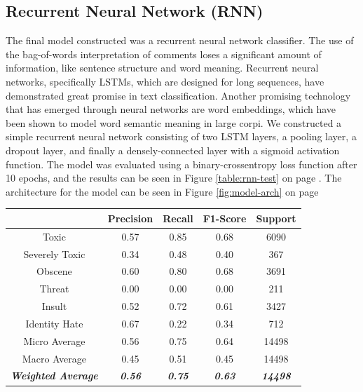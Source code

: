 \documentclass{article}
\begin{document}
{  \subsection{Recurrent Neural Network (RNN)}{
	  The final model constructed was a recurrent neural network classifier. The
	  use of the bag-of-words interpretation of comments loses a significant
	  amount of information, like sentence structure and word meaning. Recurrent
	  neural networks, specifically LSTMs, which are designed for long sequences,
	  have demonstrated great promise in text classification. Another promising
	  technology that has emerged through neural networks are word embeddings,
	  which have been shown to model word semantic meaning in large corpi. We
	  constructed a simple recurrent neural network consisting of two LSTM layers,
	  a pooling layer, a dropout layer, and finally a densely-connected layer with
	  a sigmoid activation function. The model was evaluated using a
	  binary-crossentropy loss function after 10 epochs, and the results can be
	  seen in Figure \ref{table:rnn-test} on page \pageref{table:rnn-test}. The
	  architecture for the model can be seen in Figure \ref{fig:model-arch} on
	  page \pageref{fig:model-arch}

	  \begin{table}[h!]
		  \centering
		  \begin{tabular}{|c|| c c c c|}
			  \hline
			                                     & Precision              & Recall                 & F1-Score               & Support                 \\ [0.5ex]
			  \hline\hline
			  Toxic                              & 0.57                   & 0.85                   & 0.68                   & 6090                    \\
			  Severely Toxic                     & 0.34                   & 0.48                   & 0.40                   & 367                     \\
			  Obscene                            & 0.60                   & 0.80                   & 0.68                   & 3691                    \\
			  Threat                             & 0.00                   & 0.00                   & 0.00                   & 211                     \\
			  Insult                             & 0.52                   & 0.72                   & 0.61                   & 3427                    \\
			  Identity Hate                      & 0.67                   & 0.22                   & 0.34                   & 712                     \\
			  \hline\hline
			  Micro Average                      & 0.56                   & 0.75                   & 0.64                   & 14498                   \\
			  Macro Average                      & 0.45                   & 0.51                   & 0.45                   & 14498                   \\
			  \textit{\textbf{Weighted Average}} & \textit{\textbf{0.56}} & \textit{\textbf{0.75}} & \textit{\textbf{0.63}} & \textit{\textbf{14498}} \\


\end{tabular}
\end{table}}}
\end{document}
